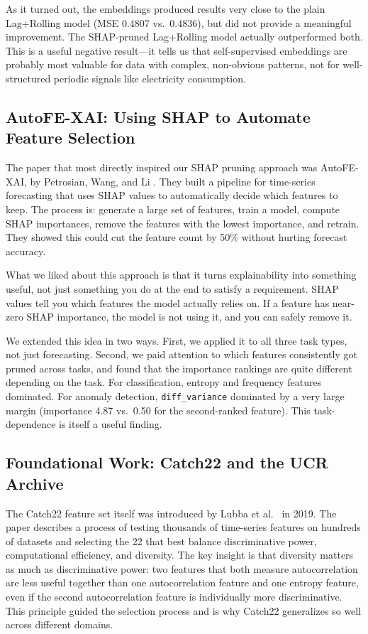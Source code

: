 \documentclass[10pt,conference]{IEEEtran}
\begin{document}
As it turned out, the embeddings produced results very close to the plain Lag+Rolling model (MSE 0.4807 vs.\ 0.4836), but did not provide a meaningful improvement. The SHAP-pruned Lag+Rolling model actually outperformed both. This is a useful negative result---it tells us that self-supervised embeddings are probably most valuable for data with complex, non-obvious patterns, not for well-structured periodic signals like electricity consumption.

\subsection{AutoFE-XAI: Using SHAP to Automate Feature Selection}

The paper that most directly inspired our SHAP pruning approach was AutoFE-XAI, by Petrosian, Wang, and Li \cite{autofe_xai}. They built a pipeline for time-series forecasting that uses SHAP values to automatically decide which features to keep. The process is: generate a large set of features, train a model, compute SHAP importances, remove the features with the lowest importance, and retrain. They showed this could cut the feature count by 50\% without hurting forecast accuracy.

What we liked about this approach is that it turns explainability into something useful, not just something you do at the end to satisfy a requirement. SHAP values tell you which features the model actually relies on. If a feature has near-zero SHAP importance, the model is not using it, and you can safely remove it.

We extended this idea in two ways. First, we applied it to all three task types, not just forecasting. Second, we paid attention to which features consistently got pruned across tasks, and found that the importance rankings are quite different depending on the task. For classification, entropy and frequency features dominated. For anomaly detection, \texttt{diff\_variance} dominated by a very large margin (importance 4.87 vs.\ 0.50 for the second-ranked feature). This task-dependence is itself a useful finding.

\subsection{Foundational Work: Catch22 and the UCR Archive}

The Catch22 feature set itself was introduced by Lubba et al.~\cite{catch22} in 2019. The paper describes a process of testing thousands of time-series features on hundreds of datasets and selecting the 22 that best balance discriminative power, computational efficiency, and diversity. The key insight is that diversity matters as much as discriminative power: two features that both measure autocorrelation are less useful together than one autocorrelation feature and one entropy feature, even if the second autocorrelation feature is individually more discriminative. This principle guided the selection process and is why Catch22 generalizes so well across different domains.
\end{document}
